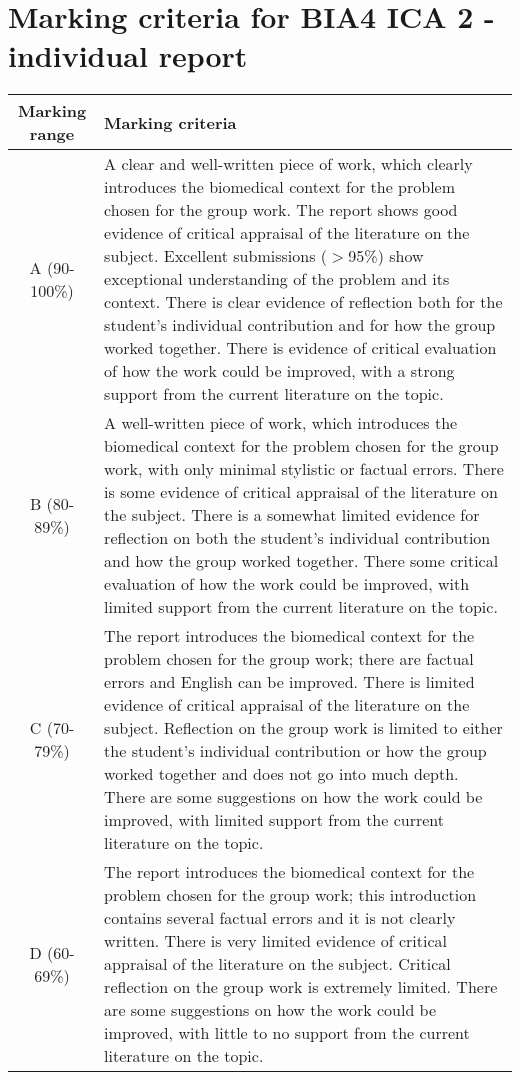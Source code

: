 \documentclass[10pt,a4paper,english]{report}
\begin{document}
\section*{Marking criteria for BIA4 ICA 2 - individual report}

\begin{tabularx}{\textwidth}{|c|X|}
\hline 
\textbf{Marking range} & \textbf{Marking criteria}\\ 
\hline 
A (90-100\%) & A clear and well-written piece of work, which clearly introduces the biomedical context for the problem chosen for the group work. The report shows good evidence of critical appraisal of the literature on the subject. Excellent submissions ($>$95\%) show exceptional understanding of the problem and its context. There is clear evidence of reflection both for the student's individual contribution and for how the group worked together. There is evidence of critical evaluation of how the work could be improved, with a strong support from the current literature on the topic.\\
\hline 
B (80-89\%) & A well-written piece of work, which introduces the biomedical context for the problem chosen for the group work, with only minimal stylistic or factual errors. There is some evidence of critical appraisal of the literature on the subject. There is a somewhat limited evidence for reflection on both the student's individual contribution and how the group worked together. There some critical evaluation of how the work could be improved, with limited support from the current literature on the topic.\\ 
\hline 
C (70-79\%) &The report introduces the biomedical context for the problem chosen for the group work; there are factual errors and English can be improved. There is limited evidence of critical appraisal of the literature on the subject. Reflection on the group work is limited to either the student's individual contribution or how the group worked together and does not go into much depth.
There are some suggestions on how the work could be improved, with limited support from the current literature on the topic.\\ 
\hline 
D (60-69\%) & The report introduces the biomedical context for the problem chosen for the group work; this introduction contains several factual errors and it is not clearly written. There is very limited evidence of critical appraisal of the literature on the subject. Critical reflection on the group work is extremely limited. There are some suggestions on how the work could be improved, with little to no support from the current literature on the topic.\\ 

\end{tabularx}
\end{document}
